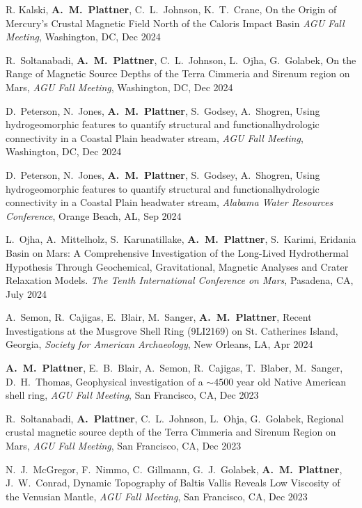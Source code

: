\documentclass[10pt]{article}
\begin{document}
\spcp R. Kalski, \textbf{A.\ M.\ Plattner}, C.\ L.\ Johnson,
K.\ T.\ Crane, On the Origin of Mercury's Crustal Magnetic Field North
of the Caloris Impact Basin \emph{AGU Fall Meeting}, Washington, DC,
Dec 2024

\spcp R.\ Soltanabadi, \textbf{A.\ M.\ Plattner}, C.\ L.\ Johnson,
L.\ Ojha, G.\ Golabek, On the Range of Magnetic Source Depths of the
Terra Cimmeria and Sirenum region on Mars, \emph{AGU Fall Meeting},
Washington, DC, Dec 2024

\spcp D.\ Peterson, N.\ Jones, \textbf{A.\ M.\ Plattner}, S.\ Godsey, A.\ Shogren, Using hydrogeomorphic features to quantify structural and functionalhydrologic connectivity in a Coastal Plain headwater stream, \emph{AGU Fall Meeting}, Washington, DC, Dec 2024

\spcp D.\ Peterson, N.\ Jones, \textbf{A.\ M.\ Plattner}, S.\ Godsey, A.\ Shogren, Using hydrogeomorphic features to quantify structural and functionalhydrologic connectivity in a Coastal Plain headwater stream, \emph{Alabama Water Resources Conference}, Orange Beach, AL, Sep 2024

\spcp
L.\ Ojha, A.\ Mittelholz, S.\ Karunatillake, \textbf{A.\ M.\ Plattner}, S.\ Karimi, Eridania Basin on Mars: A Comprehensive Investigation of the Long-Lived Hydrothermal Hypothesis Through Geochemical, Gravitational, Magnetic Analyses and Crater Relaxation Models. \emph{The Tenth International Conference on Mars}, Pasadena, CA, July 2024

\spcp A.\ Semon, R.\ Cajigas, E.\ Blair, M.\ Sanger, \textbf{A.\ M.\ Plattner}, Recent Investigations at the Musgrove Shell Ring (9LI2169) on St. Catherines Island, Georgia, \emph{Society for American Archaeology}, New Orleans, LA, Apr 2024

\spcp
\textbf{A.~M.~Plattner}, E.~B.~Blair, A.~Semon, R.~Cajigas, T.~Blaber, M.~Sanger, D.~H.~Thomas, Geophysical investigation of a $\sim4500$ year old Native American shell ring, \emph{AGU Fall Meeting}, San Francisco, CA, Dec 2023

\spcp
R.~Soltanabadi, \textbf{A.~Plattner}, C.~L.~Johnson, L.~Ohja, G.~Golabek, Regional crustal magnetic source depth of the Terra Cimmeria and Sirenum Region on Mars, \emph{AGU Fall Meeting}, San Francisco, CA, Dec 2023 

\spcp
N.~J.~McGregor, F.~Nimmo, C.~Gillmann, G.~J.~Golabek, \textbf{A.~M.~Plattner}, J.~W.~Conrad, Dynamic Topography of Baltis Vallis Reveals Low Viscosity of the Venusian Mantle, \emph{AGU Fall Meeting}, San Francisco, CA, Dec 2023
\end{document}
